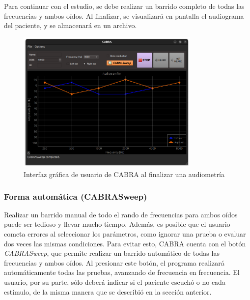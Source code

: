 Para continuar con el estudio, se debe realizar un barrido completo de todas las frecuencias y ambos oídos.
Al finalizar, se visualizará en pantalla el audiograma del paciente, y se almacenará en un archivo.

\begin{figure}[H]
    \centering
    \includegraphics[width=0.8\textwidth]{figuras/GUI_audiogram}
    \caption{Interfaz gráfica de usuario de CABRA al finalizar una audiometría}
    \label{fig:GUI_audiogram}
\end{figure}


\subsubsection{Forma automática (CABRASweep)}

Realizar un barrido manual de todo el rando de frecuencias para ambos oídos puede ser tedioso y llevar mucho tiempo.
Además, es posible que el usuario cometa errores al seleccionar los parámetros, como ignorar una prueba o evaluar
dos veces las mismas condiciones.
Para evitar esto, CABRA cuenta con el botón \textit{CABRASweep}, que permite realizar un barrido automático de todas
las frecuencias y ambos oídos.
Al presionar este botón, el programa realizará automáticamente todas las pruebas, avanzando de frecuencia en
frecuencia.
El usuario, por su parte, sólo deberá indicar si el paciente escuchó o no cada estímulo, de la misma manera que se
describió en la sección anterior.%





